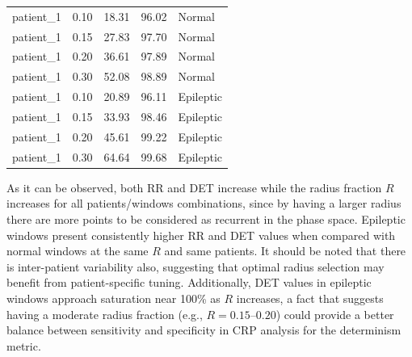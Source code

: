 \documentclass{article}
\begin{document}
\begin{table}[h!]
\begin{tabular}{l S[table-format=1.2] S[table-format=2.2] S[table-format=2.2] l}
				\midrule
				patient\_1 & 0.10 & 18.31 & 96.02 & Normal \\
				patient\_1 & 0.15 & 27.83 & 97.70 & Normal \\
				patient\_1 & 0.20 & 36.61 & 97.89 & Normal \\
				patient\_1 & 0.30 & 52.08 & 98.89 & Normal \\
				patient\_1 & 0.10 & 20.89 & 96.11 & Epileptic \\
				patient\_1 & 0.15 & 33.93 & 98.46 & Epileptic \\
				patient\_1 & 0.20 & 45.61 & 99.22 & Epileptic \\
				patient\_1 & 0.30 & 64.64 & 99.68 & Epileptic \\

				\bottomrule
				\end{tabular}
				\end{table}
				
				As it can be observed, both RR and DET increase while the radius fraction $R$ increases
				for all patients/windows combinations, since by having a larger radius there are more points to be considered as recurrent in the phase space.
				Epileptic windows present consistently higher RR and DET values when compared with normal windows at the same $R$ and same patients.
				It should be noted that there is inter-patient variability also, 
				suggesting that optimal radius selection may benefit from patient-specific tuning.
				Additionally, DET values in epileptic windows approach saturation near 100\% as $R$ increases, a fact that suggests 
				having a moderate radius fraction (e.g., $R = 0.15$--$0.20$) could provide a 
				better balance between sensitivity and specificity in CRP analysis for the determinism metric.
\end{document}
